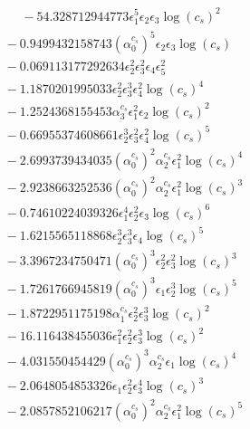 \documentclass[10pt]{article}
\begin{document}
\begin{align*}
\phantom{F_{s,7}} &\phantom{={}}{}  - 54.328712944773 \epsilon_{1}^{5} \epsilon_{2} \epsilon_{3} \log{\left(c_{s} \right)}^{2} \\
&{}  - 0.9499432158743 \left(\alpha_{0}^{c_s}\right)^{5} \epsilon_{2} \epsilon_{3} \log{\left(c_{s} \right)} \\
&{}  - 0.069113177292634 \epsilon_{2}^{2} \epsilon_{3}^{2} \epsilon_{4} \epsilon_{5}^{2} \\
&{}  - 1.1870201995033 \epsilon_{2}^{2} \epsilon_{3}^{3} \epsilon_{4}^{2} \log{\left(c_{s} \right)}^{4} \\
&{}  - 1.2524368155453 \alpha_{3}^{c_s} \epsilon_{1}^{2} \epsilon_{2} \log{\left(c_{s} \right)}^{2} \\
&{}  - 0.66955374608661 \epsilon_{2}^{3} \epsilon_{3}^{2} \epsilon_{4}^{2} \log{\left(c_{s} \right)}^{5} \\
&{}  - 2.6993739434035 \left(\alpha_{0}^{c_s}\right)^{2} \alpha_{2}^{c_s} \epsilon_{1}^{2} \log{\left(c_{s} \right)}^{4} \\
&{}  - 2.9238663252536 \left(\alpha_{0}^{c_s}\right)^{2} \alpha_{2}^{c_s} \epsilon_{1}^{2} \log{\left(c_{s} \right)}^{3} \\
&{}  - 0.74610224039326 \epsilon_{1}^{4} \epsilon_{2}^{2} \epsilon_{3} \log{\left(c_{s} \right)}^{6} \\
&{}  - 1.6215565118868 \epsilon_{2}^{3} \epsilon_{3}^{3} \epsilon_{4} \log{\left(c_{s} \right)}^{5} \\
&{}  - 3.3967234750471 \left(\alpha_{0}^{c_s}\right)^{3} \epsilon_{2}^{2} \epsilon_{3}^{2} \log{\left(c_{s} \right)}^{3} \\
&{}  - 1.7261766945819 \left(\alpha_{0}^{c_s}\right)^{3} \epsilon_{1} \epsilon_{2}^{3} \log{\left(c_{s} \right)}^{5} \\
&{}  - 1.8722951175198 \alpha_{1}^{c_s} \epsilon_{2}^{2} \epsilon_{3}^{3} \log{\left(c_{s} \right)}^{2} \\
&{}  - 16.116438455036 \epsilon_{1}^{2} \epsilon_{2}^{2} \epsilon_{3}^{3} \log{\left(c_{s} \right)}^{2} \\
&{}  - 4.031550454429 \left(\alpha_{0}^{c_s}\right)^{3} \alpha_{2}^{c_s} \epsilon_{1} \log{\left(c_{s} \right)}^{4} \\
&{}  - 2.0648054853326 \epsilon_{1} \epsilon_{2}^{2} \epsilon_{3}^{4} \log{\left(c_{s} \right)}^{3} \\
&{}  - 2.0857852106217 \left(\alpha_{0}^{c_s}\right)^{2} \alpha_{2}^{c_s} \epsilon_{1}^{2} \log{\left(c_{s} \right)}^{5} \\

\end{align*}
\end{document}
